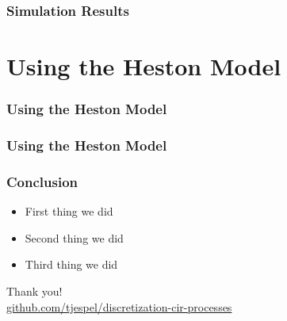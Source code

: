 \documentclass[12pt]{beamer}
\begin{document}
\begin{frame}
\frametitle{Simulation Results}
\end{frame}



\section{Using the Heston Model}
\frame{\tableofcontents[currentsection]}

\begin{frame}
\frametitle{Using the Heston Model}
\end{frame}

\begin{frame}
\frametitle{Using the Heston Model}
\end{frame}





\begin{frame}
\frametitle{Conclusion}
\begin{itemize}
  \item First thing we did
  \item Second thing we did
  \item Third thing we did
\end{itemize}
\end{frame}


\begin{frame}
\centering
{\Large Thank you!}
\\[1cm]
{\small\url{github.com/tjespel/discretization-cir-processes}}
\end{frame}
\end{document}
